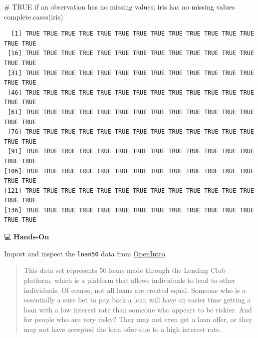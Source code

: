 \documentclass[
  letterpaper,
  DIV=11,
  numbers=noendperiod]{scrreprt}
\newenvironment{Shaded}{\begin{snugshade}}{\end{snugshade}}
\newcommand{\CommentTok}[1]{\textcolor[rgb]{0.37,0.37,0.37}{#1}}
\newcommand{\FunctionTok}[1]{\textcolor[rgb]{0.28,0.35,0.67}{#1}}
\newcommand{\NormalTok}[1]{\textcolor[rgb]{0.00,0.23,0.31}{#1}}
\begin{document}
\begin{tcolorbox}
\begin{verbatim}
\end{verbatim}

\begin{Shaded}
\begin{Highlighting}[]
\CommentTok{\# TRUE if an observation has no missing values; iris has no missing values}
\FunctionTok{complete.cases}\NormalTok{(iris)}
\end{Highlighting}
\end{Shaded}

\begin{verbatim}
  [1] TRUE TRUE TRUE TRUE TRUE TRUE TRUE TRUE TRUE TRUE TRUE TRUE TRUE TRUE TRUE
 [16] TRUE TRUE TRUE TRUE TRUE TRUE TRUE TRUE TRUE TRUE TRUE TRUE TRUE TRUE TRUE
 [31] TRUE TRUE TRUE TRUE TRUE TRUE TRUE TRUE TRUE TRUE TRUE TRUE TRUE TRUE TRUE
 [46] TRUE TRUE TRUE TRUE TRUE TRUE TRUE TRUE TRUE TRUE TRUE TRUE TRUE TRUE TRUE
 [61] TRUE TRUE TRUE TRUE TRUE TRUE TRUE TRUE TRUE TRUE TRUE TRUE TRUE TRUE TRUE
 [76] TRUE TRUE TRUE TRUE TRUE TRUE TRUE TRUE TRUE TRUE TRUE TRUE TRUE TRUE TRUE
 [91] TRUE TRUE TRUE TRUE TRUE TRUE TRUE TRUE TRUE TRUE TRUE TRUE TRUE TRUE TRUE
[106] TRUE TRUE TRUE TRUE TRUE TRUE TRUE TRUE TRUE TRUE TRUE TRUE TRUE TRUE TRUE
[121] TRUE TRUE TRUE TRUE TRUE TRUE TRUE TRUE TRUE TRUE TRUE TRUE TRUE TRUE TRUE
[136] TRUE TRUE TRUE TRUE TRUE TRUE TRUE TRUE TRUE TRUE TRUE TRUE TRUE TRUE TRUE
\end{verbatim}

\end{tcolorbox}

💻 \textbf{Hands-On}

Import and inspect the \texttt{loan50} data from
\href{https://www.openintro.org/data/index.php?data=loan50}{OpenIntro}.

\begin{quote}
This data set represents 50 loans made through the Lending Club
platform, which is a platform that allows individuals to lend to other
individuals. Of course, not all loans are created equal. Someone who is
a essentially a sure bet to pay back a loan will have an easier time
getting a loan with a low interest rate than someone who appears to be
riskier. And for people who are very risky? They may not even get a loan
offer, or they may not have accepted the loan offer due to a high
interest rate.
\end{quote}
\end{document}
